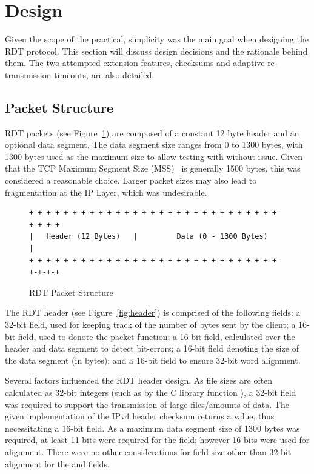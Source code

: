 \section{Design}

Given the scope of the practical, simplicity was the main goal when designing the RDT protocol. This section will discuss design decisions and the rationale behind them. The two attempted extension features, checksums and adaptive re-transmission timeouts, are also detailed.

\subsection{Packet Structure}

RDT packets (see Figure~\ref{fig:packet}) are composed of a constant 12 byte header and an optional data segment. The data segment size ranges from 0 to 1300 bytes, with 1300 bytes used as the maximum size to allow testing with  without issue. Given that the TCP Maximum Segment Size (MSS)~\cite{rfc793} is generally 1500 bytes, this was considered a reasonable choice. Larger packet sizes may also lead to fragmentation at the IP Layer, which was undesirable.

\begin{figure}[h]
\begin{verbatim}
+-+-+-+-+-+-+-+-+-+-+-+-+-+-+-+-+-+-+-+-+-+-+-+-+-+-+-+-+-+-+-+-+
|   Header (12 Bytes)   |         Data (0 - 1300 Bytes)         |
+-+-+-+-+-+-+-+-+-+-+-+-+-+-+-+-+-+-+-+-+-+-+-+-+-+-+-+-+-+-+-+-+
\end{verbatim}
\caption{RDT Packet Structure}\label{fig:packet}
\end{figure}

The RDT header (see Figure~\ref{fig:header}) is comprised of the following fields: a 32-bit  field, used for keeping track of the number of bytes sent by the client; a 16-bit  field, used to denote the packet function; a 16-bit  field, calculated over the header and data segment to detect bit-errors; a 16-bit  field denoting the size of the data segment (in bytes); and a 16-bit  field to ensure 32-bit word alignment.

Several factors influenced the RDT header design. As file sizes are often calculated as 32-bit integers (such as by the C library function ), a 32-bit  field was required to support the transmission of large files/amounts of data. The given implementation of the IPv4 header checksum returns a  value, thus necessitating a 16-bit  field. As a maximum data segment size of 1300 bytes was required, at least 11 bits were required for the  field; however 16 bits were used for alignment. There were no other considerations for field size other than 32-bit alignment for the  and  fields. 

